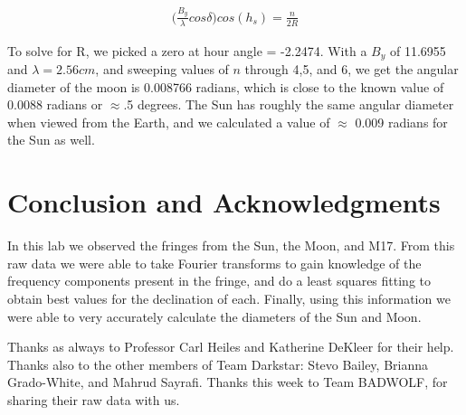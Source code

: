 \documentclass{article}
\begin{document}
\begin{eqnarray}
 \bigg(\frac{B_y}{\lambda}cos\delta \bigg) cos(h_s) = \frac{n}{2R}
\label{eq:ff_radius}
\end{eqnarray}


To solve for R, we picked a zero at hour angle = -2.2474. With a $B_y$ of 11.6955 and $\lambda = 2.56 cm$, and sweeping values of $n$ through 4,5, and 6, we get the angular diameter of the moon is 0.008766 radians, which is close to the known value of 0.0088 radians or $\approx$.5 degrees. The Sun has roughly the same angular diameter when viewed from the Earth, and we calculated a value of $\approx$ 0.009 radians for the Sun as well.

\section{Conclusion and Acknowledgments}

In this lab we observed the fringes from the Sun,  the Moon, and M17. From this raw data we were able to take Fourier transforms to gain knowledge of the frequency components present in the fringe, and do a least squares fitting to obtain best values for the declination of each. Finally, using this information we were able to very accurately calculate the diameters of the Sun and Moon. 

Thanks as always to Professor Carl Heiles and Katherine DeKleer for their help. Thanks also to the other members of Team Darkstar: Stevo Bailey, Brianna Grado-White, and Mahrud Sayrafi. Thanks this week to Team BADWOLF, for sharing their raw data with us.
\end{document}
